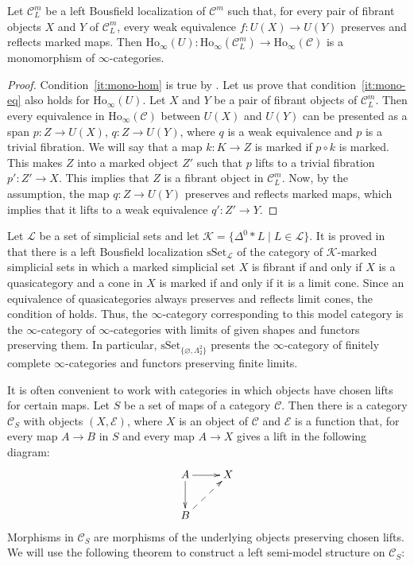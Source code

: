 \documentclass[reqno]{amsart}
\theoremstyle{definition}
\theoremstyle{remark}
\newcommand{\fs}[1]{\mathrm{#1}}
\newcommand{\Ho}{\fs{Ho}}
\newcommand{\cat}[1]{\mathcal{#1}}
\newcommand{\C}{\cat{C}}
\newcommand{\sSet}{\fs{sSet}}
\numberwithin{figure}{section}
\begin{document}
\begin{prop}
Let $\C^m_L$ be a left Bousfield localization of $\C^m$ such that, for every pair of fibrant objects $X$ and $Y$ of $\C^m_L$, every weak equivalence $f : U(X) \to U(Y)$ preserves and reflects marked maps.
Then $\Ho_\infty(U) : \Ho_\infty(\C^m_L) \to \Ho_\infty(\C)$ is a monomorphism of $\infty$-categories.
\end{prop}
\begin{proof}
Condition~\eqref{it:mono-hom} is true by .
Let us prove that condition~\eqref{it:mono-eq} also holds for $\Ho_\infty(U)$.
Let $X$ and $Y$ be a pair of fibrant objects of $\C^m_L$.
Then every equivalence in $\Ho_\infty(\C)$ between $U(X)$ and $U(Y)$ can be presented as a span $p : Z \to U(X)$, $q : Z \to U(Y)$, where $q$ is a weak equivalence and $p$ is a trivial fibration.
We will say that a map $k : K \to Z$ is marked if $p \circ k$ is marked.
This makes $Z$ into a marked object $Z'$ such that $p$ lifts to a trivial fibration $p' : Z' \to X$.
This implies that $Z$ is a fibrant object in $\C^m_L$.
Now, by the assumption, the map $q : Z \to U(Y)$ preserves and reflects marked maps,
which implies that it lifts to a weak equivalence $q' : Z' \to Y$.
\end{proof}

\begin{example}
Let $\mathcal{L}$ be a set of simplicial sets and let $\mathcal{K} = \{ \Delta^0 * L \mid L \in \mathcal{L} \}$.
It is proved in \cite[Proposition~4.1]{marked-obj} that there is a left Bousfield localization $\sSet_\mathcal{L}$ of the category of $\mathcal{K}$-marked simplicial sets
in which a marked simplicial set $X$ is fibrant if and only if $X$ is a quasicategory and a cone in $X$ is marked if and only if it is a limit cone.
Since an equivalence of quasicategories always preserves and reflects limit cones, the condition of  holds.
Thus, the $\infty$-category corresponding to this model category is the $\infty$-category of $\infty$-categories with limits of given shapes and functors preserving them.
In particular, $\sSet_{\{ \varnothing, \Lambda^2_2 \}}$ presents the $\infty$-category of finitely complete $\infty$-categories and functors preserving finite limits.
\end{example}


It is often convenient to work with categories in which objects have chosen lifts for certain maps.
Let $S$ be a set of maps of a category $\C$.
Then there is a category $\C_S$ with objects $(X,\mathcal{E})$, where $X$ is an object of $\C$ and $\mathcal{E}$ is a function that, for every map $A \to B$ in $S$ and every map $A \to X$ gives a lift in the following diagram:
\[ \xymatrix{ A \ar[r] \ar[d] & X \\
              B \ar@{-->}[ur]
            } \]
Morphisms in $\C_S$ are morphisms of the underlying objects preserving chosen lifts.
We will use the following theorem to construct a left semi-model structure on $\C_S$:
\end{document}
